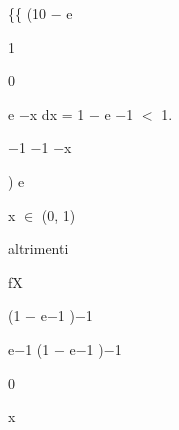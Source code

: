\documentclass[a4paper,portrait,12pt]{article}
\begin{document}
\begin{flushleft}
\{\{ (10 $-$ e
\end{flushleft}





1


0





\begin{flushleft}
e $-$x dx = 1 $-$ e $-$1 $<$ 1.
\end{flushleft}





\begin{flushleft}
$-$1 $-$1 $-$x
\end{flushleft}





\begin{flushleft}
) e
\end{flushleft}





\begin{flushleft}
x $\in$ (0, 1)
\end{flushleft}


\begin{flushleft}
altrimenti
\end{flushleft}





\begin{flushleft}
fX
\end{flushleft}


\begin{flushleft}
(1 $-$ e$-$1 )$-$1
\end{flushleft}





\begin{flushleft}
e$-$1 (1 $-$ e$-$1 )$-$1
\end{flushleft}





0





\begin{flushleft}
x
\end{flushleft}
\end{document}

